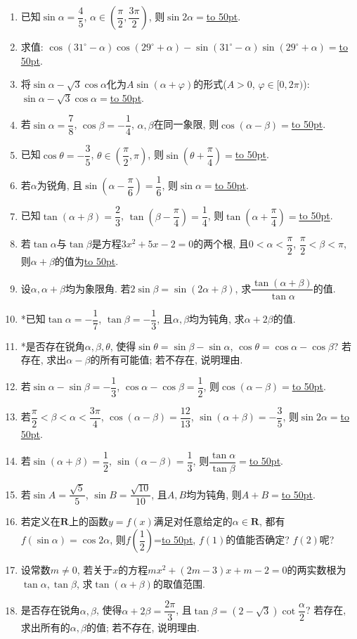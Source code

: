\documentclass[10pt,a4paper]{article}
\newcommand{\blank}[1]{\underline{\hbox to #1pt{}}}
\begin{document}
\begin{enumerate}[1.]
\item 已知$\sin\alpha=\dfrac 45$, $\alpha\in (\dfrac{\pi}2,\dfrac{3\pi}2)$, 则$\sin 2\alpha=$\blank{50}.
\item 求值: $\cos(31^\circ-\alpha)\cos(29^\circ+\alpha)-\sin(31^\circ-\alpha)\sin(29^\circ+\alpha)=$\blank{50}.
\item 将$\sin\alpha-\sqrt 3\cos\alpha$化为$A\sin(\alpha+\varphi)$的形式($A>0$, $\varphi\in [0,2\pi)$): $\sin\alpha-\sqrt 3\cos\alpha=$\blank{50}.
\item 若$\sin \alpha =\dfrac 78$, $\cos \beta =-\dfrac 14$, $\alpha,\beta$在同一象限, 则$\cos(\alpha-\beta)=$\blank{50}.
\item 已知$\cos\theta=-\dfrac 35$, $\theta\in (\dfrac{\pi}2,\pi)$, 则$\sin(\theta+\dfrac{\pi}4)=$\blank{50}.
\item 若$\alpha$为锐角, 且$\sin(\alpha-\dfrac{\pi}6)=\dfrac 16$, 则$\sin\alpha=$\blank{50}.
\item 已知$\tan(\alpha+\beta)=\dfrac 23$, $\tan(\beta-\dfrac{\pi}4)=\dfrac 14$, 则$\tan(\alpha+\dfrac{\pi}4)=$\blank{50}.
\item 若$\tan\alpha$与$\tan\beta$是方程$3x^2+5x-2=0$的两个根, 且$0<\alpha<\dfrac{\pi}2$, $\dfrac{\pi}2<\beta<\pi$, 则$\alpha+\beta$的值为\blank{50}.
\item 设$\alpha,\alpha+\beta$均为象限角. 若$2\sin\beta=\sin(2\alpha+\beta)$, 求$\dfrac{\tan(\alpha+\beta)}{\tan\alpha}$的值.
\item *已知$\tan\alpha=-\dfrac 17$, $\tan\beta=-\dfrac 13$, 且$\alpha,\beta$均为钝角, 求$\alpha+2\beta$的值.
\item *是否存在锐角$\alpha ,\beta ,\theta$, 使得$\sin\theta=\sin\beta-\sin\alpha$, $\cos\theta=\cos\alpha-\cos\beta$? 若存在, 求出$\alpha-\beta$的所有可能值; 若不存在, 说明理由.
\item 若$\sin\alpha-\sin\beta=-\dfrac 13$, $\cos\alpha-\cos\beta=\dfrac 12$, 则$\cos(\alpha-\beta)=$\blank{50}.
\item 若$\dfrac{\pi}2<\beta<\alpha<\dfrac{3\pi}4$, $\cos(\alpha-\beta)=\dfrac{12}{13}$, $\sin(\alpha+\beta)=-\dfrac 35$, 则$\sin2\alpha=$\blank{50}.
\item 若$\sin(\alpha+\beta)=\dfrac 12$, $\sin(\alpha-\beta)=\dfrac 13$, 则$\dfrac{\tan\alpha}{\tan\beta}=$\blank{50}.
\item 若$\sin A=\dfrac{\sqrt 5}5$, $\sin B=\dfrac{\sqrt{10}}{10}$, 且$A,B$均为钝角, 则$A+B=$\blank{50}.
\item 若定义在$\mathbf{R}$上的函数$y=f(x)$满足对任意给定的$\alpha\in \mathbf{R}$, 都有$f(\sin\alpha)=\cos 2\alpha$, 则$f(\dfrac 12)\text{=}$\blank{50}, $f(1)$的值能否确定? $f(2)$呢?
\item 设常数$m\ne 0$, 若关于$x$的方程$mx^2+(2m-3)x+m-2=0$的两实数根为$\tan\alpha,\tan\beta$, 求$\tan(\alpha+\beta)$的取值范围.
\item 是否存在锐角$\alpha,\beta$, 使得$\alpha+2\beta=\dfrac{2\pi}3$, 且$\tan\beta=(2-\sqrt 3)\cot\dfrac{\alpha}2$? 若存在, 求出所有的$\alpha,\beta$的值; 若不存在, 说明理由.


\end{enumerate}
\end{document}
